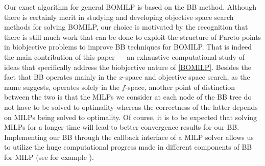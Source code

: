\documentclass[11.5pt]{article}
\newcommand{\bb}{BB}
\begin{document}

Our exact algorithm for general BOMILP is based on the \bb{} method. Although there is certainly merit in studying and developing objective space search methods for solving BOMILP, our choice is motivated by the recognition that there is still much work that can be done to exploit the structure of Pareto points in biobjective problems to improve \bb{} techniques for BOMILP. That is indeed the main contribution of this paper --- an exhaustive computational study of ideas that specifically address the biobjective nature of \eqref{BOMILP}. Besides the fact that \bb{} operates mainly in the $x$-space and objective space search, as the name suggests, operates solely in the $f$-space, another point of distinction between the two is that the MILPs we consider at each node of the \bb{} tree do not have to be solved to optimality whereas the correctness of the latter depends on MILPs being solved to optimality. Of course, it is to be expected that solving MILPs for a longer time will lead to better convergence results for our \bb{}. Implementing our \bb{} through the callback interface of a MILP solver allows us to utilize the huge computational progress made in different components of \bb{} for MILP (see for example \cite{achterberg2013mixed,morrison2016branch}). 
\end{document}
